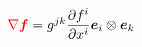 \documentclass[a4paper]{article}
\begin{document}
\pagestyle{empty}
$
{\color{red}\nabla \boldsymbol{f}} = g^{jk}\dfrac{\partial f^{i}}{\partial x^i} \boldsymbol{e}_i \otimes \boldsymbol{e}_k
$
\end{document}
